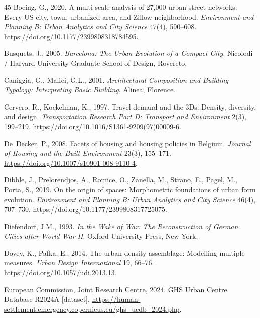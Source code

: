 \documentclass[review,authoryear]{elsarticle}
\begin{document}
\begin{thebibliography}{45}
  Boeing, G., 2020.
  \newblock A multi-scale analysis of 27,000 urban street networks: Every US city, town, urbanized area, and Zillow neighborhood.
  \newblock \emph{Environment and Planning B: Urban Analytics and City Science} 47(4), 590--608.
  \newblock \url{https://doi.org/10.1177/2399808318784595}.

  Busquets, J., 2005.
  \newblock \emph{Barcelona: The Urban Evolution of a Compact City}.
  \newblock Nicolodi / Harvard University Graduate School of Design, Rovereto.

  Caniggia, G., Maffei, G.L., 2001.
  \newblock \emph{Architectural Composition and Building Typology: Interpreting Basic Building}.
  \newblock Alinea, Florence.

  Cervero, R., Kockelman, K., 1997.
  \newblock Travel demand and the 3Ds: Density, diversity, and design.
  \newblock \emph{Transportation Research Part D: Transport and Environment} 2(3), 199--219.
  \newblock \url{https://doi.org/10.1016/S1361-9209(97)00009-6}.

  De~Decker, P., 2008.
  \newblock Facets of housing and housing policies in Belgium.
  \newblock \emph{Journal of Housing and the Built Environment} 23(3), 155--171.
  \newblock \url{https://doi.org/10.1007/s10901-008-9110-4}.

  Dibble, J., Prelorendjos, A., Romice, O., Zanella, M., Strano, E., Pagel, M., Porta, S., 2019.
  \newblock On the origin of spaces: Morphometric foundations of urban form evolution.
  \newblock \emph{Environment and Planning B: Urban Analytics and City Science} 46(4), 707--730.
  \newblock \url{https://doi.org/10.1177/2399808317725075}.

  Diefendorf, J.M., 1993.
  \newblock \emph{In the Wake of War: The Reconstruction of German Cities after World War II}.
  \newblock Oxford University Press, New York.

  Dovey, K., Pafka, E., 2014.
  \newblock The urban density assemblage: Modelling multiple measures.
  \newblock \emph{Urban Design International} 19, 66--76.
  \newblock \url{https://doi.org/10.1057/udi.2013.13}.

  European Commission, Joint Research Centre, 2024.
  \newblock GHS Urban Centre Database R2024A [dataset].
  \newblock \url{https://human-settlement.emergency.copernicus.eu/ghs_ucdb_2024.php}.


\end{thebibliography}
\end{document}
